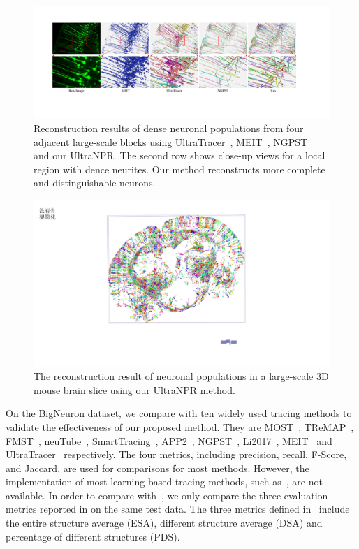 \begin{figure}[t]
	\centering
	\includegraphics[width=\textwidth]{./Illustrations/comparison_ultranpr.pdf}
	\caption{Reconstruction results of dense neuronal populations from four adjacent large-scale blocks using UltraTracer~\cite{Peng2017}, MEIT~\cite{Wang2018}, NGPST~\cite{Quan2015} and our UltraNPR. The second row shows close-up views for a local region with dence neurites. Our method reconstructs more complete and distinguishable neurons. 
	}
	\label{fig:reconstruct_blocks}
\end{figure}

\begin{figure}[t]
	\centering
	\includegraphics[width=1\columnwidth]{./Illustrations/brain_slice.pdf}
	\caption{The reconstruction result of neuronal populations in a large-scale 3D mouse brain slice using our UltraNPR method.}
	\label{fig:reconstruct_brain}
\end{figure}

On the BigNeuron dataset, we compare with ten widely used tracing methods to validate the effectiveness of our proposed method.
They are MOST~\cite{Wu2014}, TReMAP~\cite{Zhou2016}, FMST~\cite{Yang2019}, neuTube~\cite{Feng2015}, SmartTracing~\cite{Chen2015}, APP2~\cite{Xiao2013}, NGPST~\cite{Quan2015}, Li2017~\cite{Li2017},   MEIT~\cite{Wang2018} and UltraTracer~\cite{Peng2017} respectively.
%
The four metrics, including precision, recall, F-Score, and Jaccard, are used for comparisons for most methods.
However, the implementation of most learning-based tracing methods, such as~\cite{Li2017}, are not available.
In order to compare with~\cite{Li2017}, we only compare the three evaluation metrics reported in \cite{Li2017} on the same test data.
%
The three metrics defined in~\cite{Peng2010a} include the entire structure average (ESA), different structure average (DSA) and percentage of different structures (PDS).
%

